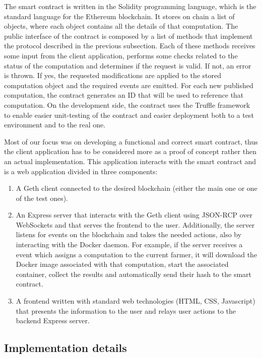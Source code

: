 The smart contract is written in the Solidity programming language, which is the standard language for the Ethereum blockchain. It stores on chain a list of  objects, where each object contains all the details of that computation. The public interface of the contract is composed by a list of methods that implement the protocol described in the previous subsection. Each of these methods receives some input from the client application, performs some checks related to the status of the computation and determines if the request is valid. If not, an error is thrown. If yes, the requested modifications are applied to the stored computation object and the required events are emitted. For each new published computation, the contract generates an ID that will be used to reference that computation.
On the development side, the contract uses the Truffle framework to enable easier unit-testing of the contract and easier deployment both to a test environment and to the real one.

Most of our focus was on developing a functional and correct smart contract, thus the client application has to be considered more as a proof of concept rather then an actual implementation. This application interacts with the smart contract and is a web application divided in three components: 
\begin{enumerate}
\item A Geth client connected to the desired blockchain (either the main one or one of the test ones).
\item An Express server that interacts with the Geth client using JSON-RCP over WebSockets and that serves the frontend to the user. Additionally, the server listens for events on the blockchain and takes the needed actions, also by interacting with the Docker daemon. For example, if the server receives a  event which assigns a computation to the current farmer, it will download the Docker image associated with that computation, start the associated container, collect the results and automatically send their hash to the smart contract.
\item A frontend written with standard web technologies (HTML, CSS, Javascript) that presents the information to the user and relays user actions to the backend Express server.
\end{enumerate}

\subsection{Implementation details}
\label{sect:impl-details}


